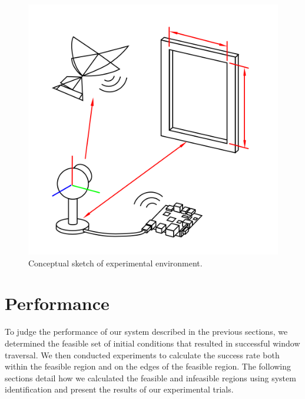 \documentclass{aamas2013}
\begin{document}
\begin{figure}[tb]
\centering
\includegraphics[width=\linewidth]{figures/experiment_cartoon.png}
\caption{Conceptual sketch of experimental environment.}
\label{fig:experiment_sketch}
\end{figure}


\section{Performance}

To judge the performance of our system described in the previous sections, we
determined the feasible set of initial conditions that resulted in successful
window traversal. We then conducted experiments to calculate the success rate
both within the feasible region and on the edges of the feasible region. The
following sections detail how we calculated the feasible and infeasible
regions using system identification and present the results of our
experimental trials.

\end{document}
